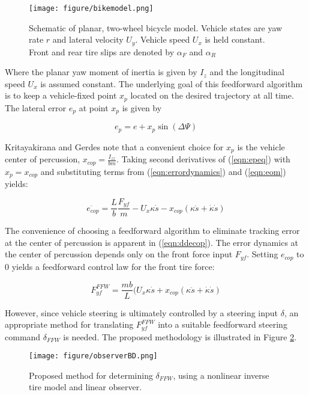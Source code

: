 \documentclass[twocolumn,10pt]{asme2e}
\begin{document}
\begin{figure}
\centering
\texttt{[image: figure/bikemodel.png]}
\caption{Schematic of planar, two-wheel bicycle model. Vehicle states are yaw rate $r$ and lateral velocity $U_y$. Vehicle speed $U_x$ is held constant. Front and rear tire slips are denoted by $\alpha_{F}$ and $\alpha_{R}$}
\label{fig:bikemodel}
\end{figure}


Where the planar yaw moment of inertia is given by $I_z$ and the longitudinal speed $U_x$ is assumed constant. The underlying
goal of this feedforward algorithm is to keep a vehicle-fixed point $x_p$ located on the desired trajectory at all time. The lateral error $e_p$ at point $x_p$ is given by 

\begin{equation}
e_p = e + x_p\sin(\Delta\Psi)
\label{eqn:epeq}
\end{equation}

Kritayakirana and Gerdes \cite{mickcop} note that a convenient choice for $x_p$ is the vehicle center of percussion, $x_{cop} = \frac{I_{zz}}{bm}$.
Taking second derivatives of (\ref{eqn:epeq}) with $x_p = x_{cop}$ and substituting terms from (\ref{eqn:errordynamics}) and (\ref{eqn:eom}) yields:

\begin{equation}
	\ddot{e_{cop}} = \frac{L}{b}\frac{F_{yf}}{m} - U_x\kappa\dot{s} - x_{cop}(\kappa\ddot{s} + \dot{\kappa}\dot{s})
\label{eqn:ddecop}
\end{equation}

The convenience of choosing a feedforward algorithm to eliminate tracking error at the center of percussion is apparent in (\ref{eqn:ddecop}). The error dynamics at the center of percussion depends only on the 
front force input $F_{yf}$. Setting $e_{cop}$ to 0 yields a feedforward control law for the front tire force:

\begin{equation}
	F^{FFW}_{yf} = \frac{mb}{L}(U_x\kappa\dot{s} + x_{cop}(\kappa\ddot{s} + \dot{\kappa}\dot{s})
\label{eqn:ddecop}
\end{equation}

However, since vehicle steering is ultimately controlled by a steering input $\delta$, an appropriate method for translating $F^{FFW}_{yf}$ into a suitable feedforward steering command $\delta_{FFW}$ is needed. The proposed methodology is illustrated in Figure \ref{fig:observerBD}.

\begin{figure}
\centering
\texttt{[image: figure/observerBD.png]}
\caption{Proposed method for determining $\delta_{FFW}$, using a nonlinear inverse tire model and linear observer.}
\label{fig:observerBD}
\end{figure}
\end{document}
